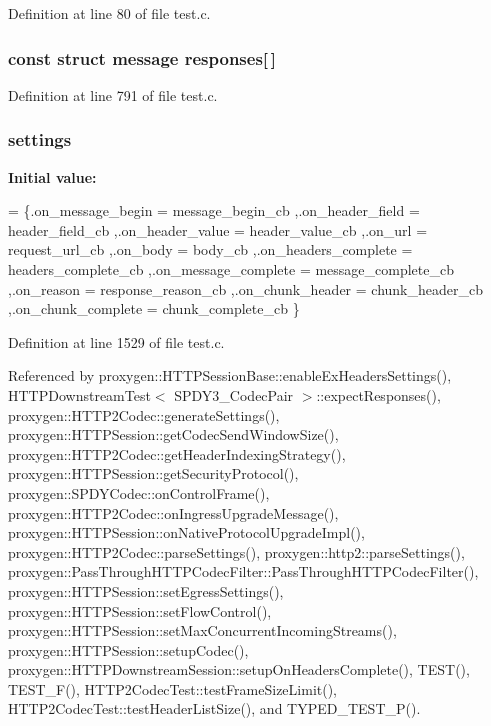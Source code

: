 Definition at line 80 of file test.\+c.

\subsubsection[{responses}]{\setlength{\rightskip}{0pt plus 5cm}const struct {\bf message} responses[$\,$]}\label{test_8c_a5b2828484e9b28dc5470ea2ab3397d57}


Definition at line 791 of file test.\+c.

\subsubsection[{settings}]{ settings\hspace{0.3cm}{\ttfamily [static]}}\label{test_8c_a1dec008fbb156669ec30f7f5f5d10d5c}
{\bfseries Initial value\+:}
\begin{DoxyCode}
=
  \{.on\_message\_begin = message_begin_cb
  ,.on\_header\_field = header_field_cb
  ,.on\_header\_value = header_value_cb
  ,.on\_url = request_url_cb
  ,.on\_body = body_cb
  ,.on\_headers\_complete = headers_complete_cb
  ,.on\_message\_complete = message_complete_cb
  ,.on\_reason = response_reason_cb
  ,.on\_chunk\_header = chunk_header_cb
  ,.on\_chunk\_complete = chunk_complete_cb
  \}
\end{DoxyCode}


Definition at line 1529 of file test.\+c.



Referenced by proxygen\+::\+H\+T\+T\+P\+Session\+Base\+::enable\+Ex\+Headers\+Settings(), H\+T\+T\+P\+Downstream\+Test$<$ S\+P\+D\+Y3\+\_\+Codec\+Pair $>$\+::expect\+Responses(), proxygen\+::\+H\+T\+T\+P2\+Codec\+::generate\+Settings(), proxygen\+::\+H\+T\+T\+P\+Session\+::get\+Codec\+Send\+Window\+Size(), proxygen\+::\+H\+T\+T\+P2\+Codec\+::get\+Header\+Indexing\+Strategy(), proxygen\+::\+H\+T\+T\+P\+Session\+::get\+Security\+Protocol(), proxygen\+::\+S\+P\+D\+Y\+Codec\+::on\+Control\+Frame(), proxygen\+::\+H\+T\+T\+P2\+Codec\+::on\+Ingress\+Upgrade\+Message(), proxygen\+::\+H\+T\+T\+P\+Session\+::on\+Native\+Protocol\+Upgrade\+Impl(), proxygen\+::\+H\+T\+T\+P2\+Codec\+::parse\+Settings(), proxygen\+::http2\+::parse\+Settings(), proxygen\+::\+Pass\+Through\+H\+T\+T\+P\+Codec\+Filter\+::\+Pass\+Through\+H\+T\+T\+P\+Codec\+Filter(), proxygen\+::\+H\+T\+T\+P\+Session\+::set\+Egress\+Settings(), proxygen\+::\+H\+T\+T\+P\+Session\+::set\+Flow\+Control(), proxygen\+::\+H\+T\+T\+P\+Session\+::set\+Max\+Concurrent\+Incoming\+Streams(), proxygen\+::\+H\+T\+T\+P\+Session\+::setup\+Codec(), proxygen\+::\+H\+T\+T\+P\+Downstream\+Session\+::setup\+On\+Headers\+Complete(), T\+E\+S\+T(), T\+E\+S\+T\+\_\+\+F(), H\+T\+T\+P2\+Codec\+Test\+::test\+Frame\+Size\+Limit(), H\+T\+T\+P2\+Codec\+Test\+::test\+Header\+List\+Size(), and T\+Y\+P\+E\+D\+\_\+\+T\+E\+S\+T\+\_\+\+P().

